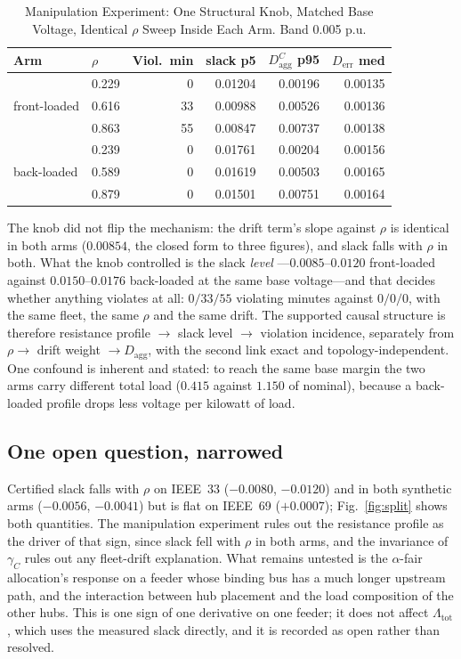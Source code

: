 \documentclass[lettersize,journal]{IEEEtran}
\newcommand{\Derr}{D_{\mathrm{err}}}
\newcommand{\Dagg}{D_{\mathrm{agg}}}
\newcommand{\Lamt}{\Lambda_{\mathrm{tot}}}
\begin{document}
\begin{table}[!t]
\renewcommand{\arraystretch}{1.15}
\caption{Manipulation Experiment: One Structural Knob, Matched Base Voltage,
Identical $\rho$ Sweep Inside Each Arm. Band 0.005 p.u.}
\label{tab:manip}
\centering\footnotesize
\begin{tabular}{@{}llrrrr@{}}
\toprule
Arm & $\rho$ & Viol.\ min & slack p5 & $\Dagg^{C}$ p95 & $\Derr$ med\\
\midrule
\multirow{3}{*}{front-loaded}
 & 0.229 & 0  & 0.01204 & 0.00196 & 0.00135\\
 & 0.616 & 33 & 0.00988 & 0.00526 & 0.00136\\
 & 0.863 & 55 & 0.00847 & 0.00737 & 0.00138\\
\midrule
\multirow{3}{*}{back-loaded}
 & 0.239 & 0 & 0.01761 & 0.00204 & 0.00156\\
 & 0.589 & 0 & 0.01619 & 0.00503 & 0.00165\\
 & 0.879 & 0 & 0.01501 & 0.00751 & 0.00164\\
\bottomrule
\end{tabular}
\end{table}

The knob did not flip the mechanism: the drift term's slope against $\rho$ is
identical in both arms ($0.00854$, the closed form to three figures), and slack
falls with $\rho$ in both. What the knob controlled is the slack \emph{level}
---$0.0085$--$0.0120$ front-loaded against $0.0150$--$0.0176$ back-loaded at
the same base voltage---and that decides whether anything violates at all:
$0/33/55$ violating minutes against $0/0/0$, with the same fleet, the same
$\rho$ and the same drift. The supported causal structure is therefore
resistance profile $\rightarrow$ slack level $\rightarrow$ violation incidence,
separately from $\rho\rightarrow$ drift weight $\rightarrow\Dagg$, with the
second link exact and topology-independent. One confound is inherent and
stated: to reach the same base margin the two arms carry different total load
($0.415$ against $1.150$ of nominal), because a back-loaded profile drops less
voltage per kilowatt of load.

\subsection{One open question, narrowed}\label{sec:open}
Certified slack falls with $\rho$ on IEEE~33 ($-0.0080$, $-0.0120$) and in both
synthetic arms ($-0.0056$, $-0.0041$) but is flat on IEEE~69 ($+0.0007$);
Fig.~\ref{fig:split} shows both quantities. The manipulation experiment rules
out the resistance profile as the driver of that sign, since slack fell with
$\rho$ in both arms, and the invariance of $\gamma_C$ rules out any
fleet-drift explanation. What remains untested is the $\alpha$-fair
allocation's response on a feeder whose binding bus has a much longer upstream
path, and the interaction between hub placement and the load composition of the
other hubs. This is one sign of one derivative on one feeder; it does not
affect $\Lamt$, which uses the measured slack directly, and it is recorded as
open rather than resolved.
\end{document}
